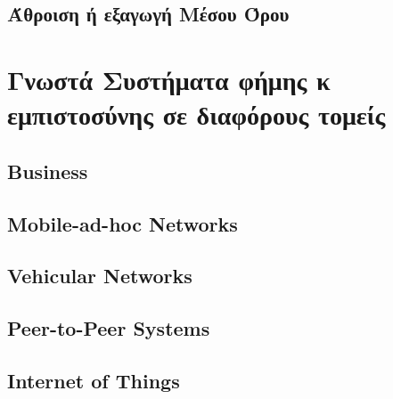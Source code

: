 \subsection{Άθροιση ή εξαγωγή Μέσου Όρου}



\section{Γνωστά Συστήματα φήμης κ εμπιστοσύνης σε διαφόρους τομείς}

\subsection{Business}


\subsection{Mobile-ad-hoc Networks}

\subsection{Vehicular Networks}

\subsection{Peer-to-Peer Systems}

\subsection{Internet of Things}




